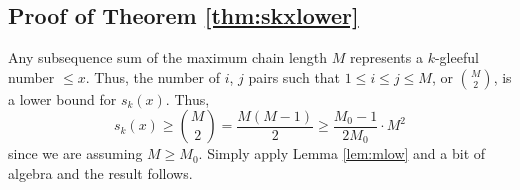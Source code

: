 \documentclass[11pt]{amsart}
\newcommand{\p}[1]{\left(#1\right)}
\newcommand{\M}{\p{\p{\frac{5}{8}}^{\frac{1}{k+1}}2x^{\frac{1}{k+1}}(k+1)\log^{-\frac{k}{k+1}}x}}
\numberwithin{equation}{section}
\numberwithin{algorithm}{section}
\begin{document}







\subsection{Proof of Theorem \ref{thm:skxlower} }

Any subsequence sum of the maximum chain length $M$ represents a $k$-gleeful
number $\le x$.  Thus,
 the number of $i$, $j$ pairs such that $1\leq i \leq j \leq M$, 
or $\binom{M}{2}$, is a lower bound for $s_k(x)$.  Thus,
$$
s_k(x) \ge \binom{M}{2} = \frac{M(M-1)}{2} \ge \frac{M_0-1}{2M_0}\cdot M^2
$$
since we are assuming $M\ge M_0$.  
Simply apply Lemma \ref{lem:mlow} and
a bit of algebra and the result follows.





\end{document}
